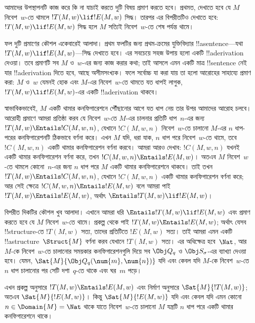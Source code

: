 \documentclass[../../../include/open-logic-section]{subfiles}
\begin{document}

\begin{explain}
আমাদের উপস্থাপনটি কাজ করে কি না যাচাই করতে দুটি বিষয় প্রমাণ করতে হবে।
প্রথমত, দেখাতে হবে যে $M$ নিবেশ~$w$-তে থামলে $!T(M,w)\lif !E(M,w)$ সিদ্ধ।
তারপর এর বিপরীতটিও দেখাতে হবে: $!T(M,w)\lif !E(M,w)$ সিদ্ধ হলে $M$ সত্যিই
নিবেশ~$w$-তে শেষ পর্যন্ত থামে।

ফল দুটি প্রমাণের কৌশল একেবারেই আলাদা। প্রথম ফলটির জন্য প্রথম-ক্রমের
যুক্তিবিদ্যার !!a{sentence}—যথা $!T(M,w)\lif !E(M,w)$—সিদ্ধ দেখাতে হবে।
এর সবচেয়ে সহজ উপায় হলো একটি !!a{derivation} দেওয়া। তবে প্রমাণটি সব
$M$ ও~$w$-এর জন্য কাজ করার কথা; তাই আসলে এমন একটি মাত্র !!{sentence} নেই
যার !!a{derivation} দিতে হবে, আছে অসীমসংখ্যক। ফলে সর্বোচ্চ যা করা যায় তা
হলো আরোহের সাহায্যে প্রমাণ করা: $M$ ও~$w$ যেমনই হোক এবং $M$-এর
নিবেশ~$w$-তে থামতে যত ধাপই লাগুক, $!T(M,w)\lif !E(M,w)$-এর একটি
!!a{derivation} থাকবে।

স্বাভাবিকভাবেই, $M$ একটি থামার কনফিগারেশনে পৌঁছানোর আগে যত ধাপ নেয় তার
উপর আমাদের আরোহ চলবে। আরোহী প্রমাণে আমরা প্রতিষ্ঠা করব যে নিবেশ~$w$-তে
$M$-এর চালনার প্রতিটি ধাপ~$n$-এর জন্য
$!T(M,w)\Entails !C(M,w,n)$, যেখানে $!C(M,w,n)$ নিবেশ~$w$-তে চালানো
$M$-এর $n$ ধাপ-পরের কনফিগারেশনটি ঠিকভাবে বর্ণনা করে। এখন $M$ যদি,
ধরা যাক, $n$ ধাপ পরে নিবেশ~$w$-তে থামে, তবে $!C(M,w,n)$ একটি থামার
কনফিগারেশন বর্ণনা করবে। আমরা আরও দেখাব: $!C(M,w,n)$ যখনই একটি থামার
কনফিগারেশন বর্ণনা করে, তখন $!C(M,w,n)\Entails !E(M,w)$। অতএব $M$
নিবেশ~$w$-তে থামলে কোনো~$n$-এর জন্য $n$ ধাপ পরে $M$ একটি থামার
কনফিগারেশনে থাকবে। তাই তখন $!T(M,w)\Entails !C(M,w,n)$, যেখানে
$!C(M,w,n)$ একটি থামার কনফিগারেশন বর্ণনা করে; আর সেই ক্ষেত্রে
$!C(M,w,n)\Entails !E(M,w)$ বলে আমরা পাই
$!T(M,w)\Entails !E(M,w)$, অর্থাৎ
$\Entails !T(M,w)\lif !E(M,w)$।


বিপরীত দিকটির কৌশল খুব আলাদা। এখানে আমরা ধরি
$\Entails !T(M,w)\lif !E(M,w)$ এবং প্রমাণ করতে হবে যে $M$ নিবেশ~$w$-তে
থামে। প্রকল্প থেকে পাই $!T(M,w)\Entails !E(M,w)$; অর্থাৎ যেসব
!!{structure}-তে $!T(M,w)$ সত্য, তাদের প্রতিটিতে $!E(M,w)$ সত্য। তাই আমরা
এমন একটি !!a{structure}~$\Struct{M}$ বর্ণনা করব যেখানে $!T(M,w)$ সত্য।
এর অধিক্ষেত্র হবে~$\Nat$, আর $M$-কে নিবেশ~$w$-তে চালানোর সময়কার
কনফিগারেশনগুলি দিয়ে সব $\Obj Q_q$ ও $\Obj S_\sigma$-এর ব্যাখ্যা দেওয়া
হবে। যেমন,
$\Sat{M}{\Obj Q_q(\num{m},\num{n})}$ যদি এবং কেবল যদি $M$-কে
নিবেশ~$w$-তে $n$ ধাপ চালানোর পর সেটি দশা~$q$-তে থাকে এবং ঘর~$m$ পড়ে।

এখন প্রকল্প অনুসারে $!T(M,w)\Entails !E(M,w)$ এবং নির্মাণ অনুসারে
$\Sat{M}{!T(M,w)}$; অতএব $\Sat{M}{!E(M,w)}$। কিন্তু
$\Sat{M}{!E(M,w)}$ যদি এবং কেবল যদি এমন কোনো
$n\in\Domain{M}=\Nat$ থাকে যাতে নিবেশ~$w$-তে চালানো $M$ যন্ত্রটি
$n$ ধাপ পরে একটি থামার কনফিগারেশনে থাকে।
\end{explain}
\end{document}
